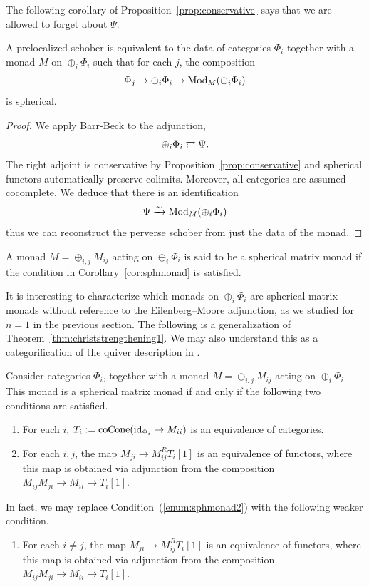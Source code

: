 The following corollary of Proposition~\ref{prop:conservative} says that we are allowed to forget about $\Psi$.

\begin{cor}\label{cor:sphmonad}
    A prelocalized schober is equivalent to the data of categories $\Phi_i$ together with a monad $M$ on $\oplus_i\Phi_i$ such that for each $j$, the composition
    \[\Phi_j \to\oplus_i\Phi_i \to \operatorname{Mod}_M(\oplus_i\Phi_i)\]
    is spherical.
\end{cor}

\begin{proof}
    We apply Barr-Beck to the adjunction,
    \[\oplus_i\Phi_i \rightleftarrows \Psi.\]
    The right adjoint is conservative by Proposition~\ref{prop:conservative} and spherical functors automatically preserve colimits. Moreover, all categories are assumed cocomplete. We deduce that there is an identification
    \[\Psi\xrightarrow{\sim}\operatorname{Mod}_M(\oplus_i\Phi_i)\]
    thus we can reconstruct the perverse schober from just the data of the monad.
\end{proof}

\begin{defn}
    A monad $M=\oplus_{i,j}M_{ij}$ acting on $\oplus_i\Phi_i$ is said to be a spherical matrix monad if the condition in Corollary~\ref{cor:sphmonad} is satisfied.
\end{defn}

It is interesting to characterize which monads on $\oplus_i\Phi_i$ are spherical matrix monads without reference to the Eilenberg--Moore adjunction, as we studied for $n=1$ in the previous section. The following is a generalization of Theorem~\ref{thm:christstrengthening1}. We may also understand this as a categorification of the quiver description in \cite{gelfandPerverseSheavesQuivers1996}.

\begin{prop}\label{prop:sphmonad}
    Consider categories $\Phi_i$, together with a monad $M=\oplus_{i,j}M_{ij}$ acting on $\oplus_i\Phi_i$. This monad is a spherical matrix monad if and only if the following two conditions are satisfied.
    \begin{enumerate}
        \item \label{enum:sphmonad1} For each $i$, $T_i:=\operatorname{coCone}(\operatorname{id}_{\Phi_i}\to M_{ii})$ is an equivalence of categories.
        \item \label{enum:sphmonad2} For each $i,j$, the map $M_{ji}\to M_{ij}^RT_i[1]$ is an equivalence of functors, where this map is obtained via adjunction from the composition $M_{ij}M_{ji}\to M_{ii}\to T_i[1]$.
    \end{enumerate}
    In fact, we may replace Condition~(\ref{enum:sphmonad2}) with the following weaker condition.
    \begin{enumerate}[resume]
        \item \label{enum:sphmonad3} For each $i\neq j$, the map $M_{ji}\to M_{ij}^RT_i[1]$ is an equivalence of functors, where this map is obtained via adjunction from the composition $M_{ij}M_{ji}\to M_{ii}\to T_i[1]$.
    \end{enumerate}
\end{prop}

